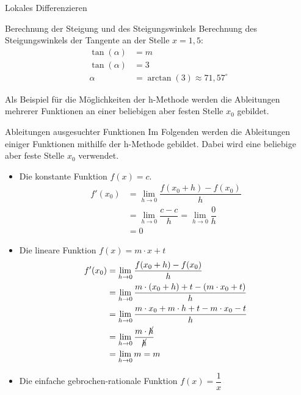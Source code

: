 \begin{section}{Lokales Differenzieren}
\begin{bsp*}{Berechnung der Steigung und des Steigungswinkels}{}
Berechnung des Steigungswinkels der Tangente an der Stelle $x=1,5 $: 
\begin{equation*}
\begin{split}
\tan{(\alpha)} &= m\\
\tan{(\alpha)} &= 3\\
\alpha &= \arctan{(3)} \approx 71,57^{\circ}  
\end{split}
\end{equation*}
\end{bsp*}
Als Beispiel für die Möglichkeiten der h-Methode werden die Ableitungen mehrerer Funktionen an einer beliebigen aber festen Stelle $x_0$ gebildet.
\begin{bsp*}{Ableitungen ausgesuchter Funktionen}{}
Im Folgenden werden die Ableitungen einiger Funktionen mithilfe der h-Methode gebildet. Dabei wird eine beliebige aber feste Stelle $x_0$ verwendet.
\begin{itemize}
    \item Die konstante Funktion $f(x) = c$. 
    \begin{equation*}
\begin{split}
f'(x_0)&= \lim_{h\rightarrow 0} \dfrac{f(x_0 +h) - f(x_0)}{h}\\
&= \lim_{h\rightarrow 0} \dfrac{c-c}{h} = \lim_{h\rightarrow 0} \dfrac{0}{h}  \\
 &= 0
\end{split}
\end{equation*}
\item Die lineare Funktion $f(x) = m\cdot x + t$
\begin{equation*}
\begin{split}
f'(x_0)&= \lim_{h\rightarrow 0} \dfrac{f(x_0 +h) - f(x_0)}{h}\\
&= \lim_{h\rightarrow 0} \dfrac{m\cdot (x_0 + h) + t -(m\cdot x_0 +t)}{h} \\
 &=  \lim_{h\rightarrow 0} \dfrac{m\cdot x_0 + m\cdot h + t - m\cdot x_0 - t }{h} \\
 &= \lim_{h\rightarrow 0} \dfrac{m\cdot \cancel{h}}{\cancel{h}} \\
 &= \lim_{h\rightarrow 0} m = m
\end{split}
\end{equation*}
\item Die einfache gebrochen-rationale Funktion $f(x) = \dfrac{1}{x}$
\begin{equation*}
\begin{split}

\end{split}
\end{equation*}
\end{itemize}
\end{bsp*}
\end{section}
